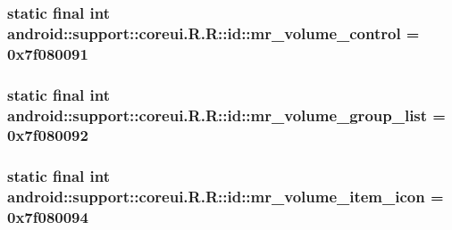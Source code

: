 \hypertarget{classandroid_1_1support_1_1coreui_1_1_r_1_1id_5b5d5ad8a997fbf4eb180df4c377afbf}{
\subsubsection[{mr\_\-volume\_\-control}]{\setlength{\rightskip}{0pt plus 5cm}static final int android::support::coreui.R.R::id::mr\_\-volume\_\-control = 0x7f080091}}
\label{classandroid_1_1support_1_1coreui_1_1_r_1_1id_5b5d5ad8a997fbf4eb180df4c377afbf}


\hypertarget{classandroid_1_1support_1_1coreui_1_1_r_1_1id_c8f83380d0be6f2c2bf6d377aaab17d1}{
\subsubsection[{mr\_\-volume\_\-group\_\-list}]{\setlength{\rightskip}{0pt plus 5cm}static final int android::support::coreui.R.R::id::mr\_\-volume\_\-group\_\-list = 0x7f080092}}
\label{classandroid_1_1support_1_1coreui_1_1_r_1_1id_c8f83380d0be6f2c2bf6d377aaab17d1}


\hypertarget{classandroid_1_1support_1_1coreui_1_1_r_1_1id_207a1b95b569f998f4760e65ed76394e}{
\subsubsection[{mr\_\-volume\_\-item\_\-icon}]{\setlength{\rightskip}{0pt plus 5cm}static final int android::support::coreui.R.R::id::mr\_\-volume\_\-item\_\-icon = 0x7f080094}}
\label{classandroid_1_1support_1_1coreui_1_1_r_1_1id_207a1b95b569f998f4760e65ed76394e}


